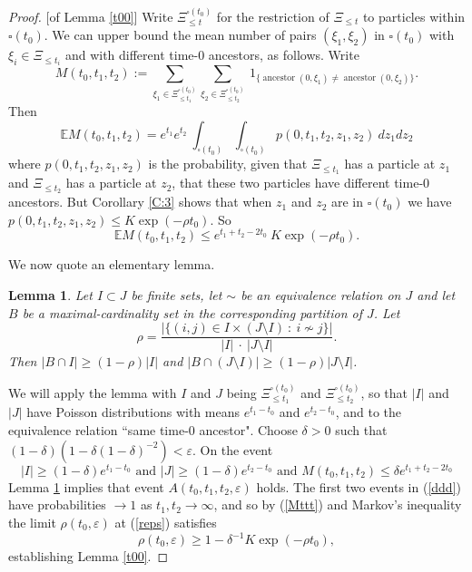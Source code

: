 \documentclass[12pt]{article}
\newtheorem{Lemma}{Lemma}
\newcommand{\eps}{\varepsilon}
\newcommand{\Ex}{{\mathbb E}}
\newcommand{\indic}{1}
\DeclareMathOperator{\ancestor}{ancestor}
\begin{document}
\begin{proof}

[of Lemma  \ref{t00}]
Write  $\Xi^{\square(t_0)}_{\le t}$ for the restriction of $\Xi_{\le t}$ to particles within $\square(t_0)$.
We can upper bound the mean number of pairs $(\xi_1, \xi_2)$ in $\square(t_0)$ with $\xi_i \in \Xi_{\le t_i}$ and with different time-$0$ ancestors, as follows.
Write
\[ M(t_0,t_1,t_2) := 
\sum_{\xi_1 \in \Xi^{\square(t_0)}_{\le t_1}}   \sum_{\xi_2 \in \Xi^{\square(t_0)}_{\le t_2}     }  
 \  \indic_{ \{ \ancestor(0,\xi_1) \neq   \ancestor(0,\xi_2)  \}} 
. \]
Then
\[
  \Ex M (t_0,t_1,t_2) 
= e^{t_1} e^{t_2} \ 
\int_{\square(t_0)} \int_{\square(t_0)} p(0,t_1,t_2,z_1,z_2) \ dz_1 dz_2
\]
where $p(0,t_1,t_2,z_1,z_2)$ is the probability, given that $\Xi_{\le t_1}$ has a particle at $z_1$ and $\Xi_{\le t_2}$ has a particle at $z_2$, 
that these two particles have different time-$0$ ancestors. 
But Corollary \ref{C:3} shows that when $z_1$ and $z_2$ are in $\square(t_0)$ we have
$ p(0,t_1,t_2,z_1,z_2) \le K \exp(- \rho t_0) $.
So 
\begin{equation}
 \Ex M(t_0,t_1,t_2) \le e^{t_1+t_2 - 2t_0} \ K \exp(- \rho t_0) . 
\label{Mttt}
\end{equation}


We now quote an elementary lemma.
\begin{Lemma}
\label{L:IJf}
Let $I \subset J$ be finite sets, let $\sim$ be an equivalence relation on $J$ and 
let $B$ be a maximal-cardinality set in the 
corresponding partition of $J$.  Let
\[ \rho = \frac
{ | \{ (i,j) \in I \times (J \setminus I) \  : \ i \not\sim j \}| }{|I| \ \cdot \ |J \setminus I|} . \]
Then 
$| B \cap I| \ge (1 - \rho) |I|$ and $| B \cap (J \setminus I) | \ge (1 - \rho)  |J \setminus I|$.
\end{Lemma}
We will apply the lemma with $I$ and $J$ being $\Xi^{\square(t_0)}_{\le t_1}$ and $\Xi^{\square(t_0)}_{\le t_2}$, so that 
$|I|$ and $|J|$ have Poisson distributions with means 
$e^{t_1-t_0}$ and $e^{t_2-t_0}$, and to the equivalence relation ``same time-$0$ ancestor". 
Choose $\delta > 0$ such that 
$(1 - \delta)(1 - \delta(1-\delta)^{-2}) < \eps$. 
On the event
\begin{equation}
|I| \ge (1 - \delta) e^{t_1-t_0} \mbox{ and }  |J| \ge (1-\delta) e^{t_2-t_0}  \mbox{ and }  M(t_0,t_1,t_2) \le \delta e^{t_1+t_2 - 2t_0}  
\label{ddd}
\end{equation}
Lemma \ref{L:IJf} implies that event $A(t_0, t_1,t_2,\eps)$ holds.  
The first two events in (\ref{ddd})  have probabilities $\to 1$ as $t_1, t_2 \to \infty$, and so by (\ref{Mttt}) and Markov's inequality
the limit $\rho(t_0,\eps)$ at (\ref{reps}) satisfies
\[ \rho(t_0,\eps) \ge 1 - \delta^{-1} K \exp(- \rho t_0) , \] 
establishing Lemma \ref{t00}.
\end{proof}
\end{document}
